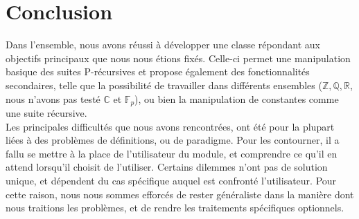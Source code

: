 \documentclass[12pt]{article}
\begin{document}
\section{Conclusion}
        Dans l'ensemble, nous avons réussi à développer une classe répondant aux objectifs
        principaux que nous nous étions fixés.
        Celle-ci permet une manipulation basique des suites P-récursives 
        et propose également des fonctionnalités secondaires, telle que la possibilité de travailler
        dans différents ensembles ($\mathbb{Z,Q,R}$, nous n'avons pas testé $\mathbb{C}$ et 
        $\mathbb F_p$), ou bien la manipulation de constantes comme une suite récursive.\\
        Les principales difficultés que nous avons rencontrées, ont été pour la plupart liées
        à des problèmes de définitions, ou de paradigme. Pour les contourner, il a fallu
        se mettre à la place de l'utilisateur du module, et comprendre ce qu'il en attend lorsqu'il choisit
        de l'utiliser. Certains dilemmes n'ont pas de solution unique, et dépendent du cas spécifique
        auquel est confronté l'utilisateur. Pour cette raison, nous nous sommes efforcés de rester 
        généraliste dans la manière dont nous traitions les problèmes, et de rendre les traitements
        spécifiques optionnels.
        
       

\end{document}
